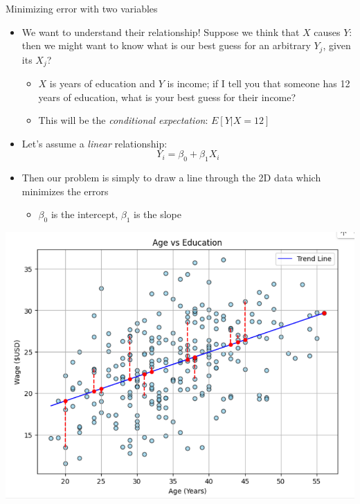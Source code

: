 \documentclass[aspectratio=169]{beamer}
\begin{document}
\begin{frame}{Minimizing error with two variables}
    \begin{itemize}
        \item We want to understand their relationship! Suppose we think that $X$ causes $Y$: then we might want to know what is our best guess for an arbitrary $Y_j$, given its $X_j$?
        \begin{itemize}
            \item $X$ is years of education and $Y$ is income; if I tell you that someone has 12 years of education, what is your best guess for their income?
            \item This will be the \textit{conditional expectation}: $E[Y|X=12]$
        \end{itemize}
        \item Let's assume a \textit{linear} relationship:
        $$
        Y_i = \beta_0 + \beta_1 X_i
        $$
        \item Then our problem is simply to draw a line through the 2D data which minimizes the errors
        \begin{itemize}
            \item $\beta_0$ is the intercept, $\beta_1$ is the slope
        \end{itemize}
    \end{itemize}
\end{frame}

\begin{frame}
    \centering
    \includegraphics[width = .6\textwidth,keepaspectratio]{./figs/age_ed.png}
\end{frame}
\end{document}
